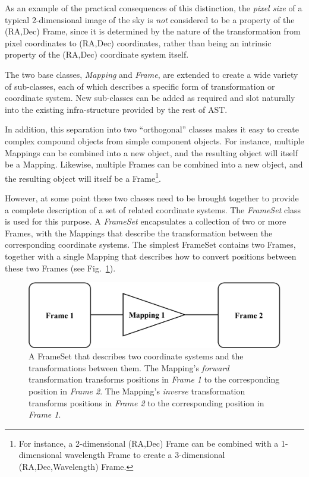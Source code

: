\documentclass[final,authoryear,5p,times,twocolumn]{elsarticle}
\begin{document}
As an example of the practical consequences of this distinction,
the \emph{pixel size} of a typical 2-dimensional image of the sky is
\emph{not} considered to be a property of the (RA,Dec) Frame, since it is
determined by the nature of the transformation from pixel coordinates to
(RA,Dec) coordinates, rather than being an intrinsic property of the (RA,Dec)
coordinate system itself.

The two base classes, \emph{Mapping} and \emph{Frame}, are extended
to create a wide variety of sub-classes, each of which describes a
specific form of transformation or coordinate system. New sub-classes can
be added as required and slot naturally into the existing
infra-structure provided by the rest of AST.

In addition, this separation into two ``orthogonal'' classes makes it
easy to create complex compound objects from simple component objects.
For instance, multiple Mappings can be combined into a new object, and
the resulting object will itself be a Mapping. Likewise, multiple Frames
can be combined into a new object, and the resulting object will itself be
a Frame\footnote{For instance, a 2-dimensional (RA,Dec) Frame can be
combined with a 1-dimensional wavelength Frame to create a 3-dimensional
(RA,Dec,Wavelength) Frame.}.

However, at some point these two classes need to be brought together to
provide a complete description of a set of related coordinate systems.
The \emph{FrameSet} class is used for this purpose. A \emph{FrameSet}
encapsulates a collection of two or more Frames, with the Mappings that
describe the transformation between the corresponding coordinate systems.
The simplest FrameSet contains two Frames, together with a single Mapping that
describes how to convert positions between these two Frames (see
Fig.~\ref{fig:simple-frameset}).

\begin{figure}[h]
\centering
\includegraphics[width=0.5\columnwidth]{simple-frameset}
\caption{A FrameSet that describes two coordinate systems and the
transformations between them. The Mapping's \emph{forward} transformation
transforms positions in \emph{Frame 1} to the corresponding position in
\emph{Frame 2}. The Mapping's \emph{inverse} transformation
transforms positions in \emph{Frame 2} to the corresponding position in
\emph{Frame 1}. }
\label{fig:simple-frameset}
\end{figure}
\end{document}
